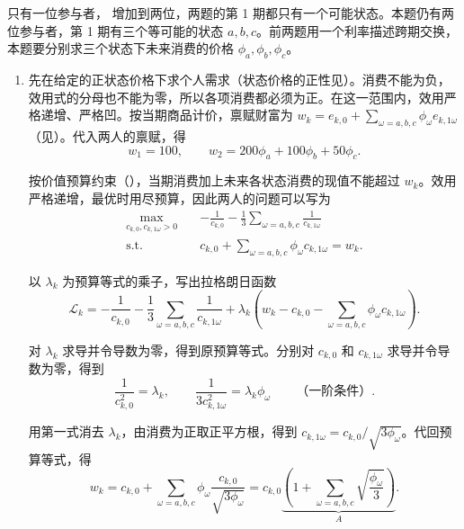 \begin{solution}[blank-type=manual,blank-vsep=9\baselineskip]
 只有一位参与者， 增加到两位，两题的第 1 期都只有一个可能状态。本题仍有两位参与者，第 1 期有三个等可能的状态 $a,b,c$。前两题用一个利率描述跨期交换，本题要分别求三个状态下未来消费的价格 $\phi_a,\phi_b,\phi_c$。

\begin{enumerate}[label=(\alph*)]
    \item 先在给定的正状态价格下求个人需求\ifdefined\WJHandoutKnowledge（状态价格的正性见）\fi。消费不能为负，效用式的分母也不能为零，所以各项消费都必须为正。在这一范围内，效用严格递增、严格凹。按当期商品计价，禀赋财富为 $w_k=e_{k,0}+\sum_{\omega=a,b,c}\phi_\omega e_{k,1\omega}$\ifdefined\WJHandoutKnowledge（见）\fi。代入两人的禀赋，得
    \[
       w_1=100,\qquad w_2=200\phi_a+100\phi_b+50\phi_c.
    \]

    按价值预算约束\ifdefined\WJHandoutKnowledge（）\fi，当期消费加上未来各状态消费的现值不能超过 $w_k$。效用严格递增，最优时用尽预算，因此两人的问题可以写为
    \[
      \begin{aligned}
       \max_{c_{k,0},c_{k,1\omega}>0}\quad&
       -\frac1{c_{k,0}}-\frac13\sum_{\omega=a,b,c}\frac1{c_{k,1\omega}}\\
       \mathrm{s.t.}\quad&c_{k,0}+\sum_{\omega=a,b,c}\phi_\omega c_{k,1\omega}=w_k.
      \end{aligned}
    \]

    以 $\lambda_k$ 为预算等式的乘子，写出拉格朗日函数
    \[
       \mathcal L_k=
       -\frac1{c_{k,0}}-\frac13\sum_{\omega=a,b,c}\frac1{c_{k,1\omega}}
       +\lambda_k\left(w_k-c_{k,0}-\sum_{\omega=a,b,c}\phi_\omega c_{k,1\omega}\right).
    \]

    对 $\lambda_k$ 求导并令导数为零，得到原预算等式。分别对 $c_{k,0}$ 和 $c_{k,1\omega}$ 求导并令导数为零，得到
    \[
       \frac1{c_{k,0}^2}=\lambda_k,\qquad
       \frac1{3c_{k,1\omega}^2}=\lambda_k\phi_\omega
       \qquad\text{（一阶条件）}.
    \]

    用第一式消去 $\lambda_k$，由消费为正取正平方根，得到 $c_{k,1\omega}=c_{k,0}/\sqrt{3\phi_\omega}$。代回预算等式，得
    \[
       w_k=c_{k,0}+\sum_{\omega=a,b,c}\phi_\omega\frac{c_{k,0}}{\sqrt{3\phi_\omega}}
       =c_{k,0}\underbrace{\left(1+\sum_{\omega=a,b,c}\sqrt{\frac{\phi_\omega}{3}}\right)}_{A}.
    \]


\end{enumerate}
\end{solution}

